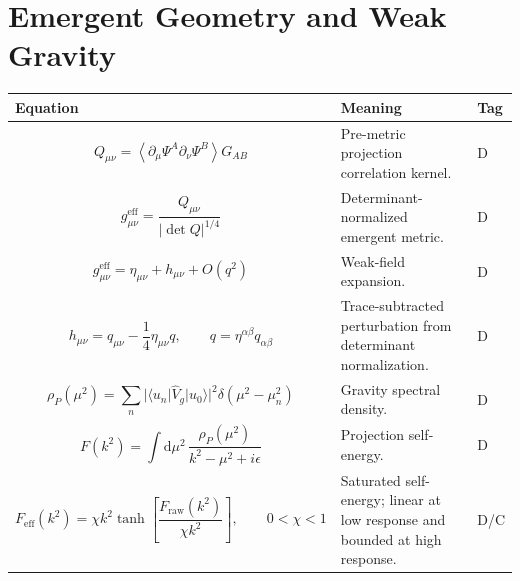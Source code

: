 \documentclass[11pt]{article}
\newcommand{\eff}{\mathrm{eff}}
\newcommand{\raw}{\mathrm{raw}}
\newcommand{\dd}{\mathrm{d}}
\begin{document}
\section{Emergent Geometry and Weak Gravity}
\begin{longtable}{>{\raggedright\arraybackslash}p{} >{\raggedright\arraybackslash}p{} >{\centering\arraybackslash}p{}}
\toprule
\textbf{Equation} & \textbf{Meaning} & \textbf{Tag} \\
\midrule
\endhead

\begin{equation}
Q_{\mu\nu}=\left\langle\partial_\mu\Psi^A\partial_\nu\Psi^B\right\rangle G_{AB}
\end{equation}
& Pre-metric projection correlation kernel. & D \\

\begin{equation}
g_{\mu\nu}^{\eff}=\frac{Q_{\mu\nu}}{|\det Q|^{1/4}}
\end{equation}
& Determinant-normalized emergent metric. & D \\

\begin{equation}
g_{\mu\nu}^{\eff}=\eta_{\mu\nu}+h_{\mu\nu}+O(q^2)
\end{equation}
& Weak-field expansion. & D \\

\begin{equation}
h_{\mu\nu}=q_{\mu\nu}-\frac14\eta_{\mu\nu}q,
\qquad q=\eta^{\alpha\beta}q_{\alpha\beta}
\end{equation}
& Trace-subtracted perturbation from determinant normalization. & D \\

\begin{equation}
\rho_P(\mu^2)=\sum_n|\langle u_n|\hat V_g|u_0\rangle|^2\delta(\mu^2-\mu_n^2)
\end{equation}
& Gravity spectral density. & D \\

\begin{equation}
F(k^2)=\int \dd\mu^2\,\frac{\rho_P(\mu^2)}{k^2-\mu^2+i\epsilon}
\end{equation}
& Projection self-energy. & D \\

\begin{equation}
F_{\eff}(k^2)=\chi k^2\tanh\left[\frac{F_{\raw}(k^2)}{\chi k^2}\right],\qquad 0<\chi<1
\end{equation}
& Saturated self-energy; linear at low response and bounded at high response. & D/C \\


\end{longtable}
\end{document}
